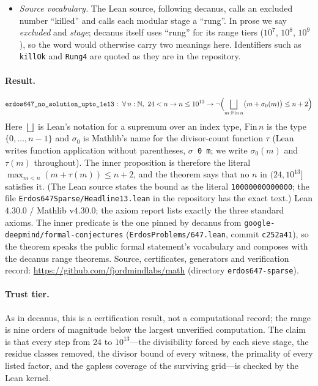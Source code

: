 \documentclass[11pt]{article}
\begin{document}
\begin{itemize}
\item \emph{Source vocabulary.} The Lean source, following decanus, calls an excluded number ``killed'' and calls each modular stage a ``rung''. In prose we say \emph{excluded} and \emph{stage}; decanus itself uses ``rung'' for its range tiers ($10^{7}$, $10^{8}$, $10^{9}$), so the word would otherwise carry two meanings here. Identifiers such as \texttt{killOk} and \texttt{Rung4} are quoted as they are in the repository.
\end{itemize}

\paragraph{Result.}
\[
\texttt{erdos647\_no\_solution\_upto\_1e13} :\ \forall\, n:\mathbb{N},\ 24<n \to n\le 10^{13} \to \neg\Bigl(\bigsqcup_{m:\mathrm{Fin}\,n} \bigl(m+\sigma_0(m)\bigr) \le n+2\Bigr)
\]
Here $\bigsqcup$ is Lean's notation for a supremum over an index type, $\mathrm{Fin}\,n$ is the type $\{0,\dots,n-1\}$ and $\sigma_0$ is Mathlib's name for the divisor-count function $\tau$ (Lean writes function application without parentheses, \texttt{$\sigma$ 0 m}; we write $\sigma_0(m)$ and $\tau(m)$ throughout). The inner proposition is therefore the literal $\max_{m<n}(m+\tau(m))\le n+2$, and the theorem says that no $n$ in $(24,10^{13}]$ satisfies it. (The Lean source states the bound as the literal \texttt{10000000000000}; the file \texttt{Erdos647Sparse/Headline13.lean} in the repository has the exact text.)
Lean 4.30.0 / Mathlib v4.30.0; the axiom report lists exactly the three standard axioms. The inner predicate is the one pinned by decanus from \texttt{google-deepmind/formal-conjectures} (\texttt{ErdosProblems/647.lean}, commit \texttt{c252a41}), so the theorem speaks the public formal statement's vocabulary and composes with the decanus range theorems. Source, certificates, generators and verification record: \url{https://github.com/fjordmindlabs/math} (directory \texttt{erdos647-sparse}).

\paragraph{Trust tier.} As in decanus, this is a certification result, not a computational record; the range is nine orders of magnitude below the largest unverified computation. The claim is that every step from $24$ to $10^{13}$---the divisibility forced by each sieve stage, the residue classes removed, the divisor bound of every witness, the primality of every listed factor, and the gapless coverage of the surviving grid---is checked by the Lean kernel.
\end{document}
